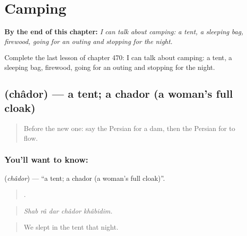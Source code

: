 
\chapter{Camping}
\label{ch:fa-camping}

\begin{chapteropening}
\textbf{By the end of this chapter:} \emph{I can talk about camping: a tent, a sleeping bag, firewood, going for an outing and stopping for the night.}

Complete the last lesson of chapter 470: I can talk about camping: a tent, a sleeping bag, firewood, going for an outing and stopping for the night.
\end{chapteropening}

\section[\texorpdfstring{\fa{چادر} (châdor)}{چادر (châdor)}]{ (châdor) — a tent; a chador (a woman's full cloak)}

\label{lesson:FA-C470-chador}



\begin{quote}
Before the new one: say the Persian for a dam, then the Persian for to flow.
\end{quote}

\subsection*{You'll want to know: }
\textbf{} (\emph{châdor}) — \textquotedblleft{}a tent; a chador (a woman's full cloak)\textquotedblright{}.

\begin{quote}
    .
\end{quote}

\begin{quote}
\emph{Shab râ dar châdor khâbidim.}
\end{quote}

\begin{quote}
We slept in the tent that night.
\end{quote}


